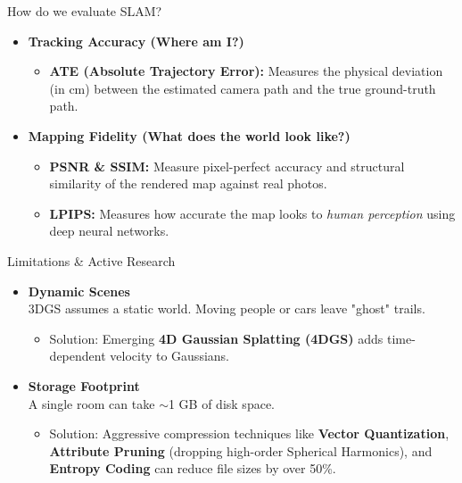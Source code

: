 \documentclass[10pt, aspectratio=169, xcolor={dvipsnames}]{beamer}
\begin{document}
\begin{frame}{How do we evaluate SLAM?}
  \begin{itemize}
    \item \textbf{Tracking Accuracy (Where am I?)}
    \begin{itemize}
      \item \textbf{ATE (Absolute Trajectory Error):} Measures the physical deviation (in cm) between the estimated camera path and the true ground-truth path.
    \end{itemize}
    \vspace{1em}
    \item \textbf{Mapping Fidelity (What does the world look like?)}
    \begin{itemize}
      \item \textbf{PSNR \& SSIM:} Measure pixel-perfect accuracy and structural similarity of the rendered map against real photos.
      \item \textbf{LPIPS:} Measures how accurate the map looks to \textit{human perception} using deep neural networks.
    \end{itemize}
  \end{itemize}
\end{frame}

\begin{frame}{Limitations \& Active Research}
  \begin{itemize}
    \item \textbf{Dynamic Scenes}\\ 3DGS assumes a static world. Moving people or cars leave "ghost" trails.
    \begin{itemize}
      \item \alert{Solution:} Emerging \textbf{4D Gaussian Splatting (4DGS)} adds time-dependent velocity to Gaussians.
    \end{itemize}
    \vspace{1em}
    \item \textbf{Storage Footprint}\\ A single room can take $\sim$1 GB of disk space.
    \begin{itemize}
      \item \alert{Solution:} Aggressive compression techniques like \textbf{Vector Quantization}, \textbf{Attribute Pruning} (dropping high-order Spherical Harmonics), and \textbf{Entropy Coding} can reduce file sizes by over 50\%.
    \end{itemize}
  \end{itemize}
\end{frame}
\end{document}

